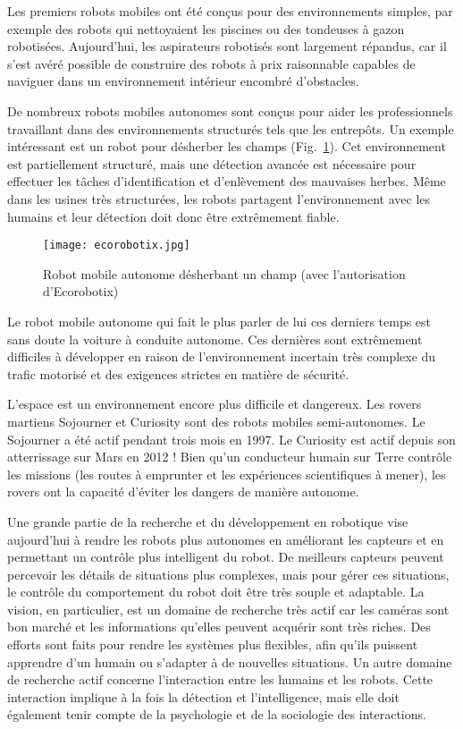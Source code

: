 {Les premiers robots mobiles ont été conçus pour des environnements simples, par exemple des robots qui nettoyaient les piscines ou des tondeuses à gazon robotisées. Aujourd'hui, les aspirateurs robotisés sont largement répandus, car il s'est avéré possible de construire des robots à prix raisonnable capables de naviguer dans un environnement intérieur encombré d'obstacles.

De nombreux robots mobiles autonomes sont conçus pour aider les professionnels travaillant dans des environnements structurés tels que les entrepôts. Un exemple intéressant est un robot pour désherber les champs (Fig.~\ref{fig.agri_robot}). Cet environnement est partiellement structuré, mais une détection avancée est nécessaire pour effectuer les tâches d'identification et d'enlèvement des mauvaises herbes. Même dans les usines très structurées, les robots partagent l'environnement avec les humains et leur détection doit donc être extrêmement fiable.

\begin{figure}
\begin{center}
\texttt{[image: ecorobotix.jpg]}
\end{center}
\caption{Robot mobile autonome désherbant un champ (avec l'autorisation d'Ecorobotix)}
\label{fig.agri_robot}
\end{figure}

Le robot mobile autonome qui fait le plus parler de lui ces derniers temps est sans doute la voiture à conduite autonome. Ces dernières sont extrêmement difficiles à développer en raison de l'environnement incertain très complexe du trafic motorisé et des exigences strictes en matière de sécurité.

L'espace est un environnement encore plus difficile et dangereux. Les rovers martiens Sojourner et Curiosity sont des robots mobiles semi-autonomes. Le Sojourner a été actif pendant trois mois en 1997. Le Curiosity est actif depuis son atterrissage sur Mars en 2012 ! Bien qu'un conducteur humain sur Terre contrôle les missions (les routes à emprunter et les expériences scientifiques à mener), les rovers ont la capacité d'éviter les dangers de manière autonome.

Une grande partie de la recherche et du développement en robotique vise aujourd'hui à rendre les robots plus autonomes en améliorant les capteurs et en permettant un contrôle plus intelligent du robot. De meilleurs capteurs peuvent percevoir les détails de situations plus complexes, mais pour gérer ces situations, le contrôle du comportement du robot doit être très souple et adaptable. La vision, en particulier, est un domaine de recherche très actif car les caméras sont bon marché et les informations qu'elles peuvent acquérir sont très riches. Des efforts sont faits pour rendre les systèmes plus flexibles, afin qu'ils puissent apprendre d'un humain ou s'adapter à de nouvelles situations. Un autre domaine de recherche actif concerne l'interaction entre les humains et les robots. Cette interaction implique à la fois la détection et l'intelligence, mais elle doit également tenir compte de la psychologie et de la sociologie des interactions.

}
